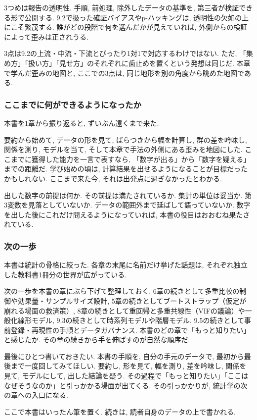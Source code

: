 3つめは報告の透明性.
手順, 前処理, 除外したデータの基準を, 第三者が検証できる形で公開する.
9.2で扱った確証バイアスやp-ハッキングは, 透明性の欠如の上にこそ繁茂する.
誰がどの段階で何を選んだかが見えていれば, 外側からの検証によって歪みは正されうる.

3点は9.2の上流・中流・下流とぴったり1対1で対応するわけではない. ただ, 「集め方」「扱い方」「見せ方」のそれぞれに歯止めを置くという発想は同じだ.
本章で学んだ歪みの地図と, ここでの3点は, 同じ地形を別の角度から眺めた地図である.

\subsubsection*{ここまでに何ができるようになったか}

本書を1章から振り返ると, ずいぶん遠くまで来た.

要約から始めて, データの形を見て, ばらつきから幅を計算し, 群の差を吟味し, 関係を測り, モデルを当て, そして本章で手法の外側にある歪みを地図にした.
ここまでに獲得した能力を一言で表すなら, 「数字が出る」から「数字を疑える」までの距離だ.
学び始めの頃は, 計算結果を出せるようになることが目標だったかもしれない.
ここまで来た今, それは出発点に過ぎなかったとわかる.

出した数字の前提は何か. その前提は満たされているか. 集計の単位は妥当か. 第3変数を見落としていないか. データの範囲外まで延ばして語っていないか.
数字を出した後にこれだけ問えるようになっていれば, 本書の役目はおおむね果たされている.

\subsubsection*{次の一歩}

本書は統計の骨格に絞った.
各章の末尾に名前だけ挙げた話題は, それぞれ独立した教科書1冊分の世界が広がっている.

次の一歩を本書の章にぶら下げて整理しておく.
6章の続きとして多重比較の制御や効果量・サンプルサイズ設計, 5章の続きとしてブートストラップ（仮定が崩れる場面の救済策）, 8章の続きとして重回帰と多重共線性（VIFの議論）や一般化線形モデル, 9.3の続きとして時系列モデルや階層モデル, 9.5の続きとして事前登録・再現性の手順とデータガバナンス.
本書のどの章で「もっと知りたい」と感じたか. その章の続きから手を伸ばすのが自然な順序だ.

最後にひとつ書いておきたい.
本書の手順を, 自分の手元のデータで, 最初から最後まで一度回してみてほしい.
要約し, 形を見て, 幅を測り, 差を吟味し, 関係を見て, モデルにして, 出した結論を疑う.
その過程で「もっと知りたい」「ここはなぜそうなのか」と引っかかる場面が出てくる.
その引っかかりが, 統計学の次の章への入口になる.

ここで本書はいったん筆を置く. 続きは, 読者自身のデータの上で書かれる.

